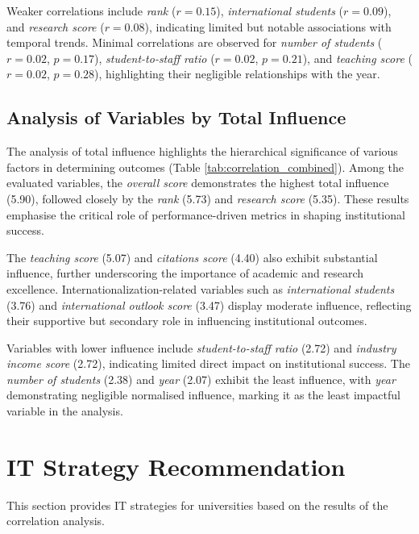 \documentclass[conference]{IEEEtran}
\begin{document}
Weaker correlations include \textit{rank} ($r = 0.15$), \textit{international students} ($r = 0.09$), and \textit{research score} ($r = 0.08$), indicating limited but notable associations with temporal trends. Minimal correlations are observed for \textit{number of students} ($r = 0.02$, $p = 0.17$), \textit{student-to-staff ratio} ($r = 0.02$, $p = 0.21$), and \textit{teaching score} ($r = 0.02$, $p = 0.28$), highlighting their negligible relationships with the year.

\subsection{Analysis of Variables by Total Influence}

The analysis of total influence highlights the hierarchical significance of various factors in determining outcomes (Table \ref{tab:correlation_combined}). Among the evaluated variables, the \textit{overall score} demonstrates the highest total influence (5.90), followed closely by the \textit{rank} (5.73) and \textit{research score} (5.35). These results emphasise the critical role of performance-driven metrics in shaping institutional success.

The \textit{teaching score} (5.07) and \textit{citations score} (4.40) also exhibit substantial influence, further underscoring the importance of academic and research excellence. Internationalization-related variables such as \textit{international students} (3.76) and \textit{international outlook score} (3.47) display moderate influence, reflecting their supportive but secondary role in influencing institutional outcomes.

Variables with lower influence include \textit{student-to-staff ratio} (2.72) and \textit{industry income score} (2.72), indicating limited direct impact on institutional success. The \textit{number of students} (2.38) and \textit{year} (2.07) exhibit the least influence, with \textit{year} demonstrating negligible normalised influence, marking it as the least impactful variable in the analysis.


\section{IT Strategy Recommendation}

This section provides IT strategies for universities based on the results of the correlation analysis.
\end{document}
